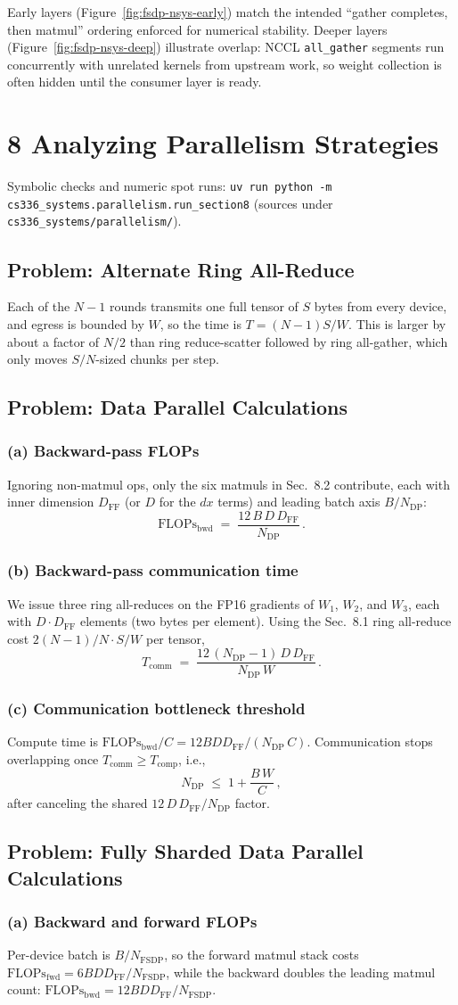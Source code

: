 \documentclass[11pt]{article}
\newcommand{\question}[1]{\subsection*{#1}}
\newcommand{\subquestion}[1]{\subsubsection*{#1}}
\begin{document}
Early layers (Figure~\ref{fig:fsdp-nsys-early}) match the intended ``gather completes, then matmul'' ordering enforced for numerical stability. Deeper layers (Figure~\ref{fig:fsdp-nsys-deep}) illustrate overlap: NCCL \texttt{all\_gather} segments run concurrently with unrelated kernels from upstream work, so weight collection is often hidden until the consumer layer is ready.

\section*{8 Analyzing Parallelism Strategies}

\noindent Symbolic checks and numeric spot runs: \texttt{uv run python -m cs336\_systems.parallelism.run\_section8} (sources under \texttt{cs336\_systems/parallelism/}).

\question{Problem: Alternate Ring All-Reduce}
Each of the $N-1$ rounds transmits one full tensor of $S$ bytes from every device, and egress is bounded by $W$, so the time is $T=(N-1)S/W$. This is larger by about a factor of $N/2$ than ring reduce-scatter followed by ring all-gather, which only moves $S/N$-sized chunks per step.

\question{Problem: Data Parallel Calculations}
\subquestion{(a) Backward-pass FLOPs}
Ignoring non-matmul ops, only the six matmuls in Sec.~8.2 contribute, each with inner dimension $D_{\mathrm{FF}}$ (or $D$ for the $d x$ terms) and leading batch axis $B/N_{\mathrm{DP}}$:
\[
  \mathrm{FLOPs}_{\mathrm{bwd}} \;=\; \frac{12\,B\,D\,D_{\mathrm{FF}}}{N_{\mathrm{DP}}}\,.
\]
\subquestion{(b) Backward-pass communication time}
We issue three ring all-reduces on the FP16 gradients of $W_{1}$, $W_{2}$, and $W_{3}$, each with $D\cdot D_{\mathrm{FF}}$ elements (two bytes per element). Using the Sec.~8.1 ring all-reduce cost $2(N-1)/N\cdot S/W$ per tensor,
\[
  T_{\mathrm{comm}} \;=\; \frac{12\,(N_{\mathrm{DP}}-1)\,D\,D_{\mathrm{FF}}}{N_{\mathrm{DP}}\,W}\,.
\]
\subquestion{(c) Communication bottleneck threshold}
Compute time is $\mathrm{FLOPs}_{\mathrm{bwd}}/C = 12 B D D_{\mathrm{FF}}/(N_{\mathrm{DP}}\,C)$. Communication stops overlapping once $T_{\mathrm{comm}}\ge T_{\mathrm{comp}}$, i.e.,
\[
  N_{\mathrm{DP}} \;\le\; 1 + \frac{B\,W}{C}\,,
\]
after canceling the shared $12\,D\,D_{\mathrm{FF}}/N_{\mathrm{DP}}$ factor.

\question{Problem: Fully Sharded Data Parallel Calculations}
\subquestion{(a) Backward and forward FLOPs}
Per-device batch is $B/N_{\mathrm{FSDP}}$, so the forward matmul stack costs $\displaystyle \mathrm{FLOPs}_{\mathrm{fwd}} = 6 B D D_{\mathrm{FF}}/N_{\mathrm{FSDP}}$, while the backward doubles the leading matmul count: $\displaystyle \mathrm{FLOPs}_{\mathrm{bwd}} = 12 B D D_{\mathrm{FF}}/N_{\mathrm{FSDP}}$.
\end{document}
